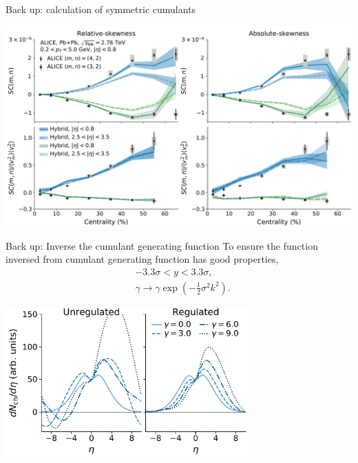 \documentclass[11pt]{beamer}
\begin{document}
\begin{frame}[noframenumbering]{Back up: calculation of symmetric cumulants}
\begin{center}
\includegraphics[width=\textwidth]{smn.pdf}
\end{center}
\end{frame}

\begin{frame}[noframenumbering]{Back up: Inverse the cumulant generating function}
To ensure the function inversed from cumulant generating function has good properties, 
\begin{eqnarray}
&-3.3\sigma < y < 3.3\sigma, \\
&\gamma \rightarrow \gamma\exp\left(-\frac{1}{2}\sigma^2k^2\right).
\end{eqnarray}
\begin{center}
\includegraphics[width=0.7\textwidth]{regulate.pdf}
\end{center}
\end{frame}
\end{document}
